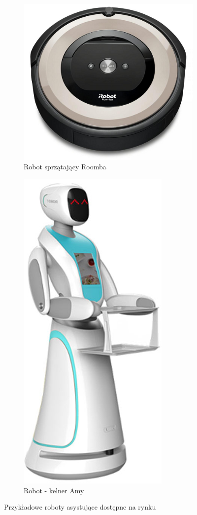 \begin{figure}[!h]
  \begin{subfigure}[t]{0.5\linewidth}
    \centering
    \includegraphics[width=0.7\linewidth]{img/robot_roomba.png} 
    \caption{Robot sprzątający Roomba \cite{b_site_roomba}} 
  \end{subfigure}%
  \begin{subfigure}[t]{0.5\linewidth}
    \centering
    \includegraphics[width=0.4\linewidth]{img/robot_amy.jpg}
    \caption{Robot - kelner Amy \cite{b_site_Amy}} 
  \end{subfigure}
  
  \centering
  \caption{Przykładowe roboty asystujące dostępne na rynku}
  \label{f_przykladowe_roboty_uslugowe}
\end{figure}


